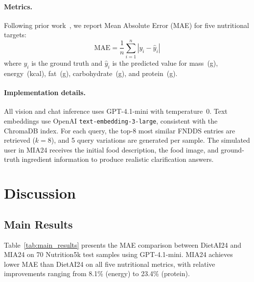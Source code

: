 \documentclass[11pt]{article}
\begin{document}
\paragraph{Metrics.}
Following prior work~\citep{yan2025dietai24}, we report Mean Absolute Error (MAE) for five nutritional targets:
\begin{equation}
\mathrm{MAE} = \frac{1}{n}\sum_{i=1}^{n} |y_i - \hat{y}_i|
\end{equation}
where $y_i$ is the ground truth and $\hat{y}_i$ is the predicted value for mass~(g), energy~(kcal), fat~(g), carbohydrate~(g), and protein~(g).

\paragraph{Implementation details.}
All vision and chat inference uses GPT-4.1-mini with temperature~0.
Text embeddings use OpenAI \texttt{text-embedding-3-large}, consistent with the ChromaDB index.
For each query, the top-8 most similar FNDDS entries are retrieved ($k{=}8$), and 5 query variations are generated per sample.
The simulated user in MIA24 receives the initial food description, the food image, and ground-truth ingredient information to produce realistic clarification answers.

\section{Discussion}
\label{sec:discussion}

\subsection{Main Results}

Table~\ref{tab:main_results} presents the MAE comparison between DietAI24 and MIA24 on 70 Nutrition5k test samples using GPT-4.1-mini.
MIA24 achieves lower MAE than DietAI24 on all five nutritional metrics, with relative improvements ranging from 8.1\% (energy) to 23.4\% (protein).
\end{document}
